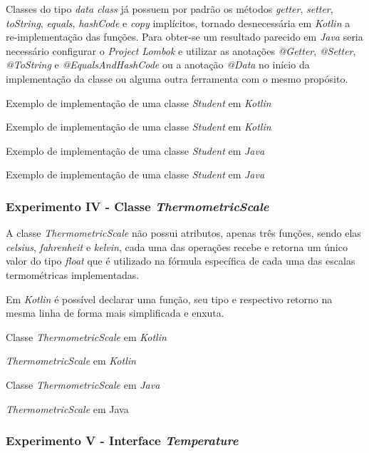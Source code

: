 Classes do tipo \textit{data class}  já possuem por padrão os métodos \textit{getter}, \textit{setter}, \textit{toString}, \textit{equals}, \textit{hashCode} e \textit{copy} implícitos, tornado desnecessária em \textit{Kotlin} a re-implementação das funções. Para obter-se um resultado parecido em \textit{Java} seria necessário configurar o \textit{Project Lombok} e utilizar as anotações \textit{@Getter}, \textit{@Setter}, \textit{@ToString} e \textit{@EqualsAndHashCode} ou a anotação \textit{@Data} no início da implementação da classe ou alguma outra ferramenta com o mesmo propósito.

Exemplo de implementação de uma classe \textit{Student} em \textit{Kotlin}
\caption{Exemplo de implementação de uma classe \textit{Student} em \textit{Kotlin}}
 

Exemplo de implementação de uma classe \textit{Student} em \textit{Java}
\caption{Exemplo de implementação de uma classe \textit{Student} em \textit{Java}}
 

\subsubsection{Experimento IV - Classe \textit{ThermometricScale}}

A classe \textit{ThermometricScale} não possui atributos, apenas três funções, sendo elas \textit{celsius}, \textit{fahrenheit} e \textit{kelvin}, cada uma das operações recebe e retorna um único valor do tipo \textit{float} que é utilizado na fórmula específica de cada uma das escalas termométricas implementadas.

Em \textit{Kotlin} é possível declarar uma função, seu tipo e respectivo retorno na mesma linha de forma mais simplificada e enxuta.

Classe \textit{ThermometricScale} em \textit{Kotlin}
\caption{\textit{ThermometricScale} em \textit{Kotlin}}
 

Classe \textit{ThermometricScale} em \textit{Java}
\caption{\textit{ThermometricScale} em Java}


\subsubsection{Experimento V - Interface \textit{Temperature}}

